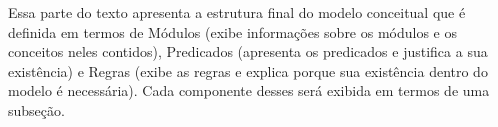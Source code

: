 Essa parte do texto apresenta a estrutura final do modelo conceitual que é definida em termos de Módulos (exibe informações sobre os módulos e os conceitos neles contidos), Predicados (apresenta os predicados e justifica a sua existência) e Regras (exibe as regras e explica porque sua existência dentro do modelo é necessária). Cada componente desses será exibida em termos de uma subseção. 